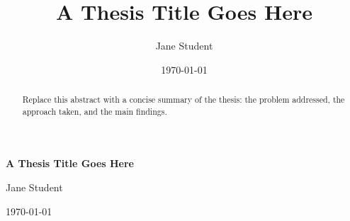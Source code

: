 \documentclass[oneside,11pt,a4paper]{report}
\title{A Thesis Title Goes Here}
\author{Jane Student}
\date{\today}
\begin{document}
\begin{titlepage}
    \centering
    \vspace*{2cm}
    {\Large\bfseries A Thesis Title Goes Here\par}
    \vspace{1.5cm}
    {\large Jane Student\par}
    \vfill
    {\large \today\par}
\end{titlepage}

\begin{abstract}
Replace this abstract with a concise summary of the thesis: the problem
addressed, the approach taken, and the main findings.
\end{abstract}

\tableofcontents
\newpage




\appendix

\cleardoublepage
\printglossaries

\cleardoublepage


\end{document}
